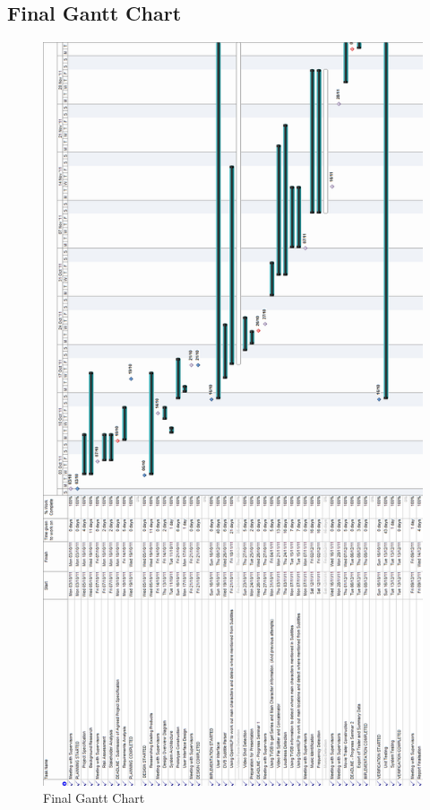 \newpage
\subsection{Final Gantt Chart}
\begin{figure}[h1]
\begin{center}
\includegraphics[trim = 0mm 0mm 0mm 0mm, clip, scale=0.25]{Images/final_gantt_chart.png}
\end{center}
\caption{Final Gantt Chart}
\end{figure}